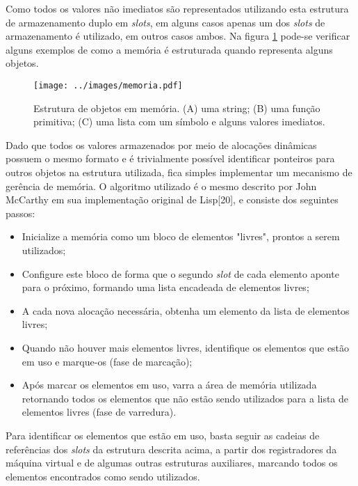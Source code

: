 Como todos os valores não imediatos são representados utilizando esta
estrutura de armazenamento duplo em \textit{slots}, em alguns casos apenas um dos \textit{slots}
de armazenamento é utilizado, em outros casos ambos. Na figura \ref{fig:memoria}
pode-se verificar alguns exemplos de como a memória é estruturada quando
representa alguns objetos.


\begin{figure}[h!]
\centering
\texttt{[image: ../images/memoria.pdf]}
\caption{Estrutura de objetos em memória. (A) uma string; (B) uma função
         primitiva; (C) uma lista com um símbolo e alguns valores imediatos.}
\label{fig:memoria}
\end{figure}

Dado que todos os valores armazenados por meio de alocações dinâmicas possuem o
mesmo formato e é trivialmente possível identificar ponteiros para outros
objetos na estrutura utilizada, fica simples implementar um mecanismo de
gerência de memória. O algoritmo utilizado é o mesmo descrito por John McCarthy
em sua implementação original de Lisp[20], e consiste dos seguintes passos:

\begin{itemize}

\item Inicialize a memória como um bloco de elementos "livres", prontos a serem
utilizados;
 
\item Configure este bloco de forma que o segundo \textit{slot} de cada elemento aponte
para o próximo, formando uma lista encadeada de elementos livres;
 
\item A cada nova alocação necessária, obtenha um elemento da lista de
elementos livres;
 
\item Quando não houver mais elementos livres, identifique os elementos que
estão em uso e marque-os (fase de marcação);
 
\item Após marcar os elementos em uso, varra a área de memória utilizada
retornando todos os elementos que não estão sendo utilizados para a lista de
elementos livres (fase de varredura).

\end{itemize}

Para identificar os elementos que estão em uso, basta seguir as cadeias de
referências dos \textit{slots} da estrutura descrita acima, a partir dos registradores
da máquina virtual e de algumas outras estruturas auxiliares, marcando todos os
elementos encontrados como sendo utilizados.

